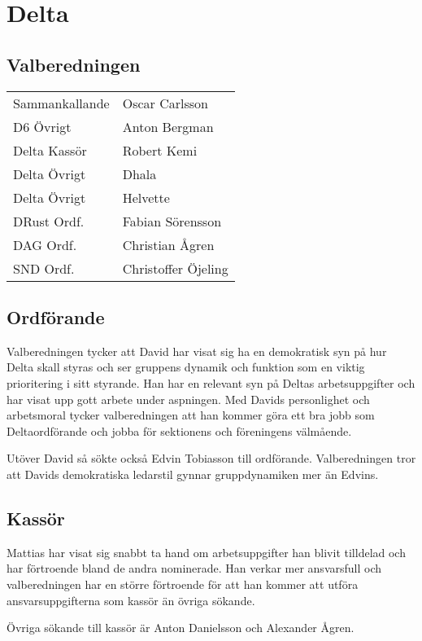 \section{Delta}

\subsection{Valberedningen}
\begin{autoframe}
\begin{tabular}{ll}

Sammankallande & Oscar Carlsson \\
D6 Övrigt & Anton Bergman \\
Delta Kassör & Robert Kemi \\
Delta Övrigt & Dhala \\
Delta Övrigt & Helvette \\
DRust Ordf. & Fabian Sörensson \\
DAG Ordf. & Christian Ågren \\
SND Ordf. & Christoffer Öjeling \\


\end{tabular}

\end{autoframe}

\subsection{Ordförande}
\begin{autoframe}

Valberedningen tycker att David har visat sig ha en demokratisk syn på hur Delta skall styras och ser gruppens dynamik och funktion som en viktig prioritering i sitt styrande. Han har en relevant syn på Deltas arbetsuppgifter och har visat upp gott arbete under aspningen. Med Davids personlighet och arbetsmoral tycker valberedningen att han kommer göra ett bra jobb som Deltaordförande och jobba för sektionens och föreningens välmående.
\bigskip

Utöver David så sökte också Edvin Tobiasson till ordförande. Valberedningen tror att Davids demokratiska ledarstil gynnar gruppdynamiken mer än Edvins.
\end{autoframe}

\subsection{Kassör}
\begin{autoframe}

Mattias har visat sig snabbt ta hand om arbetsuppgifter han blivit tilldelad och har förtroende bland de andra nominerade. Han verkar mer ansvarsfull och valberedningen har en större förtroende för att han kommer att utföra ansvarsuppgifterna som kassör än övriga sökande.

\bigskip
Övriga sökande till kassör är Anton Danielsson och Alexander Ågren.
\end{autoframe}

